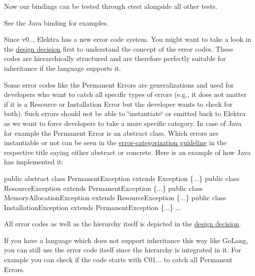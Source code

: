 

Now our bindings can be tested through {\ttfamily ctest} alongside all other tests.

See the Java binding for examples.

Since v0.., Elektra has a new error code system. You might want to take a look in the \hyperlink{doc_decisions_error_codes_md}{design decision} first to understand the concept of the error codes. These codes are hierarchically structured and are therefore perfectly suitable for inheritance if the language supports it.

Some error codes like the {\ttfamily Permanent Errors} are generalizations and used for developers who want to catch all specific types of errors (e.\+g., it does not matter if it is a Resource or Installation Error but the developer wants to check for both). Such errors should not be able to \char`\"{}instantiate\char`\"{} or emitted back to Elektra as we want to force developers to take a more specific category. In case of Java for example the {\ttfamily Permanent Error} is an abstract class. Which errors are instantiable or not can be seen in the \hyperlink{doc_dev_error-categorization_md}{error-\/categorization guideline} in the respective title saying either {\ttfamily abstract} or {\ttfamily concrete}. Here is an example of how Java has implemented it\+:


\begin{DoxyCode}
\textcolor{keyword}{public} \textcolor{keyword}{abstract} \textcolor{keyword}{class }PermanentException \textcolor{keyword}{extends} Exception \{...\}
    \textcolor{keyword}{public} \textcolor{keyword}{class }ResourceException \textcolor{keyword}{extends} PermanentException \{...\}
        \textcolor{keyword}{public} \textcolor{keyword}{class }MemoryAllocationException \textcolor{keyword}{extends} ResourceException \{...\}
    \textcolor{keyword}{public} \textcolor{keyword}{class }InstallationException \textcolor{keyword}{extends} PermanentException \{...\}
...
\end{DoxyCode}


All error codes as well as the hierarchy itself is depicted in the \hyperlink{doc_decisions_error_codes_md}{design decision}.

If you have a language which does not support inheritance this way like Go\+Lang, you can still use the error code itself since the hierarchy is integrated in it. For example you can check if the code starts with {\ttfamily C01...} to catch all {\ttfamily Permanent Errors}.

